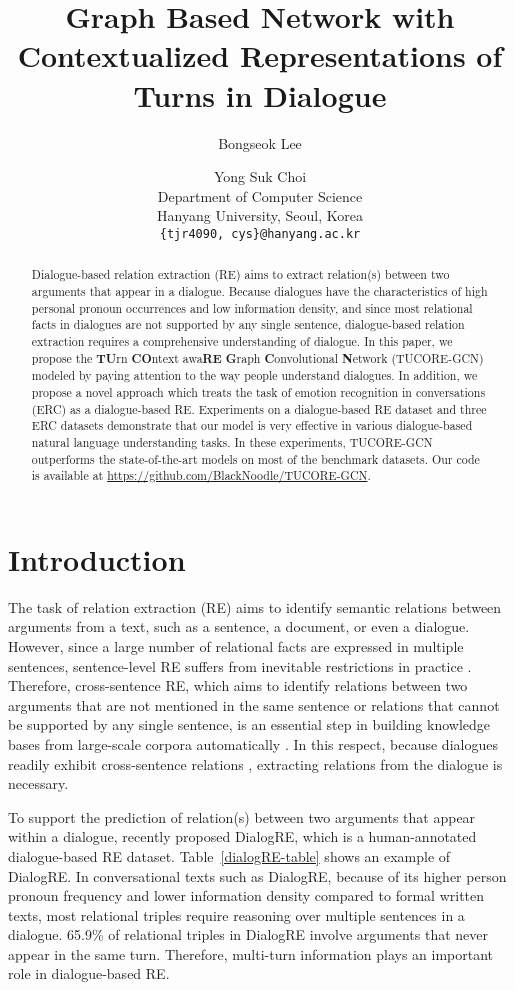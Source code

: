 \documentclass[11pt]{article}
\title{Graph Based Network with Contextualized Representations of Turns in Dialogue}
\author{Bongseok Lee \and Yong Suk Choi\Thanks{ Corresponding author}\\ 
  Department of Computer Science \\
  Hanyang University, Seoul, Korea \\
  \texttt{\{tjr4090, cys\}@hanyang.ac.kr} \\}
\begin{document}
\maketitle
\begin{abstract}
Dialogue-based relation extraction (RE) aims to extract relation(s) between two arguments that appear in a dialogue. Because dialogues have the characteristics of high personal pronoun occurrences and low information density, and since most relational facts in dialogues are not supported by any single sentence, dialogue-based relation extraction requires a comprehensive understanding of dialogue. In this paper, we propose the \textbf{TU}rn \textbf{CO}ntext awa\textbf{RE} \textbf{G}raph \textbf{C}onvolutional \textbf{N}etwork (TUCORE-GCN) modeled by paying attention to the way people understand dialogues. In addition, we propose a novel approach which treats the task of emotion recognition in conversations (ERC) as a dialogue-based RE. Experiments on a dialogue-based RE dataset and three ERC datasets demonstrate that our model is very effective in various dialogue-based natural language understanding tasks. In these experiments, TUCORE-GCN outperforms the state-of-the-art models on most of the benchmark datasets. Our code is available at \url{https://github.com/BlackNoodle/TUCORE-GCN}.
\end{abstract}

\section{Introduction}
The task of relation extraction (RE) aims to identify semantic relations between arguments from a text, such as a sentence, a document, or even a dialogue. However, since a large number of relational facts are expressed in multiple sentences, sentence-level RE suffers from inevitable restrictions in practice \citep{yao-etal-2019-docred}. Therefore, cross-sentence RE, which aims to identify relations between two arguments that are not mentioned in the same sentence or relations that cannot be supported by any single sentence, is an essential step in building knowledge bases from large-scale corpora automatically \citep{Ji10overviewof, swampillai-stevenson-2010-inter, Surdeanu2013OverviewOT}. In this respect, because dialogues readily exhibit cross-sentence relations \citep{yu-etal-2020-dialogue}, extracting relations from the dialogue is necessary.

To support the prediction of relation(s) between two arguments that appear within a dialogue, \citet{yu-etal-2020-dialogue} recently proposed DialogRE, which is a human-annotated dialogue-based RE dataset.
Table~\ref{dialogRE-table} shows an example of DialogRE. 
In conversational texts such as DialogRE, because of its higher person pronoun frequency \citep{Biber_Variation88} and lower information density \citep{wang-liu-2011-pilot} compared to formal written texts, most relational triples require reasoning over multiple sentences in a dialogue. 
65.9\% of relational triples in DialogRE involve arguments that never appear in the same turn. Therefore, multi-turn information plays an important role in dialogue-based RE.
\end{document}
